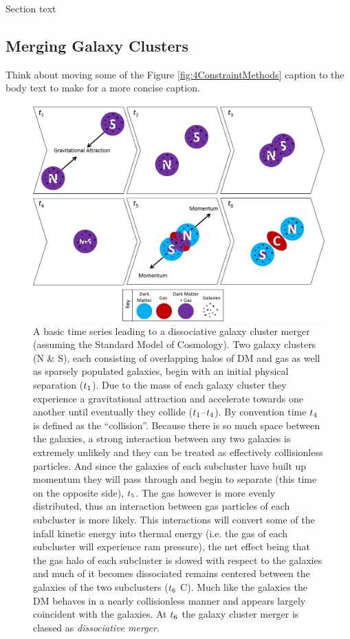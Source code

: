 Section text

\subsection{Merging Galaxy Clusters}

Think about moving some of the Figure \ref{fig:4ConstraintMethods} caption to the body text to make for a more concise caption.

\begin{figure}
\centering
\includegraphics[width=6in]{Chapter1/MergerTimeSeries.png}
\caption{A basic time series leading to a dissociative galaxy cluster merger (assuming the Standard Model of Cosmology).
Two galaxy clusters (N \& S), each consisting of overlapping halos of DM and gas as well as sparsely populated galaxies, begin with an initial physical separation ($t_{\rm 1}$).
Due to the mass of each galaxy cluster they experience a gravitational attraction and accelerate towards one another until eventually they collide ($t_{\rm 1}$--$t_{\rm 4}$).
By convention time $t_{\rm 4}$ is defined as the ``collision''.
Because there is so much space between the galaxies, a strong interaction between any two galaxies is extremely unlikely and they can be treated as effectively collisionless particles.
And since the galaxies of each subcluster have built up momentum they will pass through and begin to separate (this time on the opposite side), $t_{\rm 5}$.
The gas however is more evenly distributed, thus an interaction between gas particles of each subcluster is more likely.
This interactions will convert some of the infall kinetic energy into thermal energy (i.e. the gas of each subcluster will experience ram pressure), the net effect being that the gas halo of each subcluster is slowed with respect to the galaxies and much of it becomes dissociated remains centered between the galaxies of the two subclusters ($t_{\rm 6}$ C).
Much like the galaxies the DM behaves in a nearly collisionless manner and appears largely coincident with the galaxies.
At $t_{\rm 6}$ the galaxy cluster merger is classed as \emph{dissociative merger}.
\label{fig:MergerTimeSeries}}
\end{figure}  

